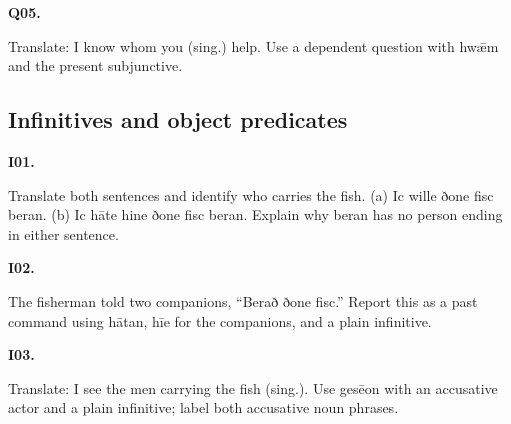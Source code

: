 \par\begin{minipage}{\linewidth}\raggedright
\textbf{Q05.}

Translate: I know whom you (sing.) help. Use a dependent question with hwǣm and the present subjunctive.

\end{minipage}\par\addvspace{4pt}

\subsection*{Infinitives and object predicates}

\par\begin{minipage}{\linewidth}\raggedright
\textbf{I01.}

Translate both sentences and identify who carries the fish. (a) Ic wille ðone fisc beran. (b) Ic hāte hine ðone fisc beran. Explain why beran has no person ending in either sentence.

\end{minipage}\par\addvspace{4pt}

\par\begin{minipage}{\linewidth}\raggedright
\textbf{I02.}

The fisherman told two companions, “Berað ðone fisc.” Report this as a past command using hātan, hīe for the companions, and a plain infinitive.

\end{minipage}\par\addvspace{4pt}

\par\begin{minipage}{\linewidth}\raggedright
\textbf{I03.}

Translate: I see the men carrying the fish (sing.). Use gesēon with an accusative actor and a plain infinitive; label both accusative noun phrases.

\end{minipage}\par\addvspace{4pt}

